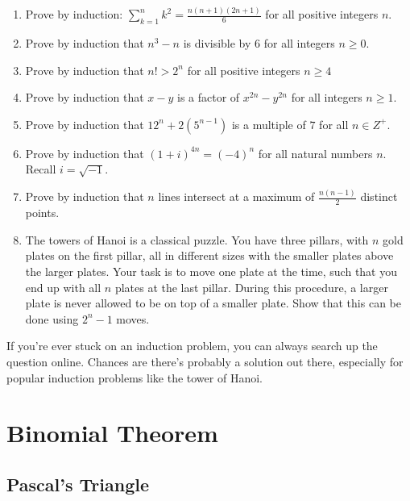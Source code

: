 \documentclass{article}
\begin{document}
\begin{enumerate}
    \item Prove by induction: $\displaystyle\sum_{k=1}^{n}k^2 = \frac{n(n+1)(2n+1)}{6}$ for all positive integers $n$. 
    \item Prove by induction that $n^3 - n$ is divisible by 6 for all integers $n \geq 0$.
    \item Prove by induction that $n! > 2^n$ for all positive integers $n \geq 4$
    \item Prove by induction that $x-y$ is a factor of $x^{2n}-y^{2n}$ for all integers $n \geq 1$.
    \item Prove by induction that $12^n + 2(5^{n-1})$ is a multiple of $7$ for all $n \in Z^{+}$.
    \item Prove by induction that $(1+i)^{4n} = (-4)^n$ for all natural numbers $n$. Recall $i = \sqrt{-1}$.
    \item Prove by induction that $n$ lines intersect at a maximum of $\frac{n(n-1)}{2}$ distinct points.
     \item The towers of Hanoi is a classical puzzle. You have three pillars, with $n$ gold plates on the first pillar, all in different sizes with the smaller plates above the larger plates. Your task is to move one plate at the time, such that you end up with all $n$ plates at the last pillar. During this procedure, a larger plate is never allowed to be on top of a smaller plate. Show that this can be done using $2^{n}- 1$ moves.
\end{enumerate}

\bigskip

If you're ever stuck on an induction problem, you can always search up the question online. Chances are there's probably a solution out there, especially for popular induction problems like the tower of Hanoi.

\bigskip

\section{Binomial Theorem}

\subsection{Pascal's Triangle}
\end{document}

